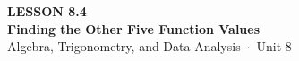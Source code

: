 \documentclass[aspectratio=169, 11pt]{beamer}
\begin{document}
{
\begin{frame}[plain]
  \vspace{2.8cm}\hspace{0.55cm}%
  \begin{minipage}{0.9\textwidth}
    {\color{goldacc}\bfseries\small LESSON 8.4}\\[0.5cm]
    {\color{white}\bfseries\LARGE Finding the Other Five Function Values}\\[1.2cm]
    {\color{mistmid}\small Algebra, Trigonometry, and Data Analysis~$\cdot$~Unit 8}
  \end{minipage}
\end{frame}
}

\begin{frame}[t, plain]
\end{frame}
\end{document}
